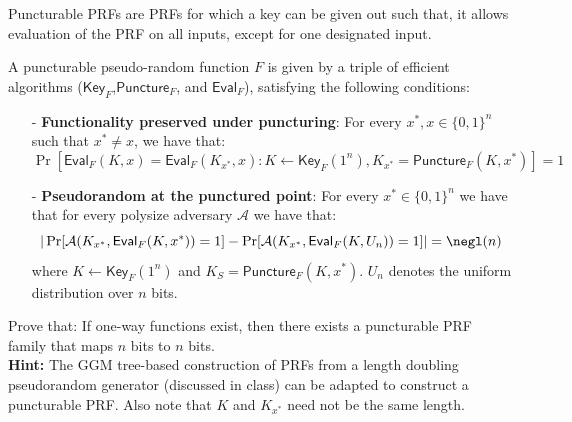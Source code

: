 \begin{exercise} Puncturable PRFs are PRFs for which a key can be given out such that, it allows evaluation of the PRF on all inputs, except for one designated input.

    \newcommand{\A}{\mathcal{A}}
    \newcommand{\F}{F}
    \newcommand{\KeyF}{\mathsf{Key}_{\F}}
    \newcommand{\PunctureF}{\mathsf{Puncture}_{\F}}
    \newcommand{\EvalF}{\mathsf{Eval}_{\F}}


    A puncturable pseudo-random function $\F$ is given by a triple of efficient algorithms ($\KeyF$,$\PunctureF$, and $\EvalF$), satisfying the following conditions:
    \begin{itemize}
        \item[-] \textbf{Functionality preserved under puncturing}: For every $x^*, x \in \{0,1\}^{n}$ such that $x^* \neq x$, we have that:
              $$\Pr[\EvalF(K,x) = \EvalF(K_{x^*},x) : K \gets \KeyF(1^n), K_{x^*} = \PunctureF(K,x^*)] = 1$$
        \item[-] \textbf{Pseudorandom at the punctured point}: For every $x^*\in \{0,1\}^n$ we have that for every polysize adversary $\A$ we have that:
              $$|\Pr[\A(K_{x^*}, \EvalF(K,x^*)) = 1] - \Pr[\A(K_{x^*}, \EvalF(K,U_n)) = 1]|= \negl(n)$$
              where $K \gets \KeyF(1^n)$ and $K_S = \PunctureF(K,x^*)$. $U_n$ denotes the uniform distribution over $n$ bits.
    \end{itemize}

    Prove that: If one-way functions exist, then there exists a puncturable PRF family that maps $n$ bits to $n$ bits. \\
    \textbf{Hint:} The GGM tree-based construction of PRFs from a length doubling pseudorandom generator (discussed in class) can be adapted to construct a puncturable PRF. Also note that $K$ and $K_{x^*}$ need not be the same length.
\end{exercise}
%
%
